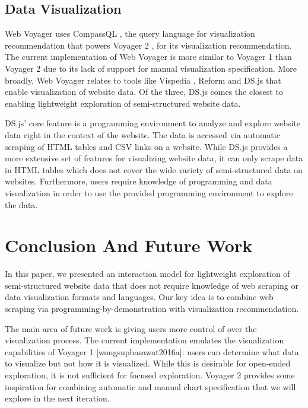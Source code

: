 \documentclass[sigconf,screen]{acmart}
\begin{document}
\hypertarget{data-visualization-1}{%
\subsection{Data Visualization}\label{data-visualization-1}}

Web Voyager uses CompassQL \citep[ ]{wongsuphasawat2016}, the query
language for visualization recommendation that powers Voyager 2
\citep{wongsuphasawat2017}, for its visualization recommendation. The
current implementation of Web Voyager is more similar to Voyager 1 than
Voyager 2 due to its lack of support for manual visualization
specification. More broadly, Web Voyager relates to tools like Vispedia
\citep{chan2008}, Reform \citep{toomim2009} and DS.js \citep{zhang2017}
that enable visualization of website data. Of the three, DS.js comes the
closest to enabling lightweight exploration of semi-structured website
data.

DS.js' core feature is a programming environment to analyze and explore
website data right in the context of the website. The data is accessed
via automatic scraping of HTML tables and CSV links on a website. While
DS.js provides a more extensive set of features for visualizing website
data, it can only scrape data in HTML tables which does not cover the
wide variety of semi-structured data on websites. Furthermore, users
require knowledge of programming and data visualization in order to use
the provided programming environment to explore the data.

\hypertarget{sec:conclusion}{%
\section{Conclusion And Future Work}\label{sec:conclusion}}

In this paper, we presented an interaction model for lightweight
exploration of semi-structured website data that does not require
knowledge of web scraping or data visualization formats and languages.
Our key idea is to combine web scraping via programming-by-demonstration
with visualization recommendation.

The main area of future work is giving users more control of over the
visualization process. The current implementation emulates the
visualization capabilities of Voyager 1 {[}wongsuphasawat2016a{]}: users
can determine what data to visualize but not how it is visualized. While
this is desirable for open-ended exploration, it is not sufficient for
focused exploration. Voyager 2 \citep{wongsuphasawat2017} provides some
inspiration for combining automatic and manual chart specification that
we will explore in the next iteration.




\end{document}
